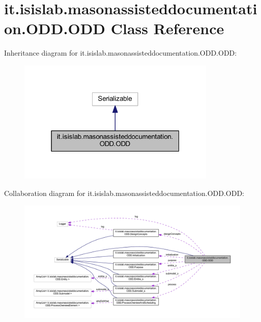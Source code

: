 \hypertarget{classit_1_1isislab_1_1masonassisteddocumentation_1_1_o_d_d_1_1_o_d_d}{\section{it.\-isislab.\-masonassisteddocumentation.\-O\-D\-D.\-O\-D\-D Class Reference}
\label{classit_1_1isislab_1_1masonassisteddocumentation_1_1_o_d_d_1_1_o_d_d}
}


Inheritance diagram for it.\-isislab.\-masonassisteddocumentation.\-O\-D\-D.\-O\-D\-D\-:\nopagebreak
\begin{figure}[H]
\begin{center}
\leavevmode
\includegraphics[width=268pt]{classit_1_1isislab_1_1masonassisteddocumentation_1_1_o_d_d_1_1_o_d_d__inherit__graph}
\end{center}
\end{figure}


Collaboration diagram for it.\-isislab.\-masonassisteddocumentation.\-O\-D\-D.\-O\-D\-D\-:\nopagebreak
\begin{figure}[H]
\begin{center}
\leavevmode
\includegraphics[width=350pt]{classit_1_1isislab_1_1masonassisteddocumentation_1_1_o_d_d_1_1_o_d_d__coll__graph}
\end{center}
\end{figure}
